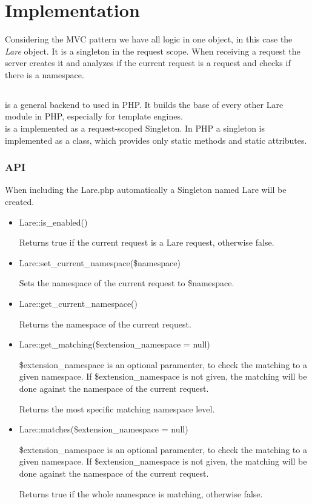 \section{Implementation}

Considering the MVC pattern we have all logic in one object, in this case the \emph{Lare} object.
It is a singleton in the request scope.
When receiving a request the server creates it and analyzes if the current request is a \lare{} request and checks if there is a namespace.

\subsection{\phpLare{}}
\phpLare{} is a general \lare{} backend to used in PHP.
It builds the base of every other Lare module in PHP, especially for template engines.
\\
\lare{} is a implemented as a request-scoped Singleton.
In PHP a singleton is implemented as a class, which provides only static methods and static attributes.

\subsubsection{API}

When including the Lare.php automatically a Singleton named Lare will be created.
\begin{itemize}
\item Lare::is\_enabled()

Returns true if the current request is a Lare request, otherwise false.
\item Lare::set\_current\_namespace(\$namespace)

Sets the namespace of the current request to \$namespace.
\item Lare::get\_current\_namespace()

Returns the namespace of the current request.
\item Lare::get\_matching(\$extension\_namespace = null)

\$extension\_namespace is an optional paramenter, to check the matching to a given namespace. If \$extension\_namespace is not given, the matching will be done against the namespace of the current request.

Returns the most specific matching namespace level.
\item Lare::matches(\$extension\_namespace = null)

\$extension\_namespace is an optional paramenter, to check the matching to a given namespace. If \$extension\_namespace is not given, the matching will be done against the namespace of the current request.

Returns true if the whole namespace is matching, otherwise false.
\end{itemize}
    
